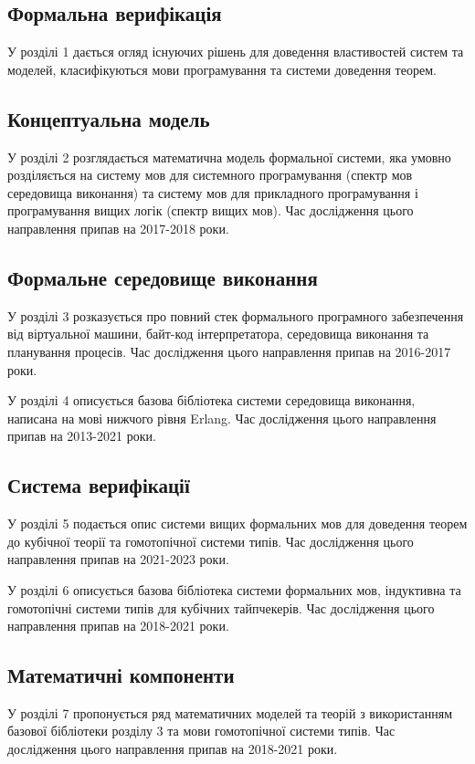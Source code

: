 \subsection*{Формальна верифікація}
У розділі 1 дається огляд існуючих рішень для доведення
властивостей систем та моделей, класифікуються мови програмування
та системи доведення теорем.

\subsection*{Концептуальна модель}
У розділі 2 розглядається математична модель формальної системи,
яка умовно розділяється на систему мов для системного
програмування (спектр мов середовища виконання) та систему мов для
прикладного програмування і програмування вищих логік (спектр вищих мов).
Час дослідження цього направлення припав на 2017-2018 роки.

\subsection*{Формальне середовище виконання}
У розділі 3 розказується про повний стек формального програмного забезпечення
від віртуальної машини, байт-код інтерпретатора, середовища виконання
та планування процесів. Час дослідження цього направлення припав на 2016-2017 роки.

У розділі 4 описується базова бібліотека системи середовища виконання,
написана на мові нижчого рівня Erlang.
Час дослідження цього направлення припав на 2013-2021 роки.

\newpage
\subsection*{Система верифікації}
У розділі 5 подається опис системи вищих формальних мов для доведення теорем до
кубічної теорії та гомотопічної системи типів.
Час дослідження цього направлення припав на 2021-2023 роки.

У розділі 6 описується базова бібліотека системи формальних мов, індуктивна
та гомотопічні системи типів для кубічних тайпчекерів.
Час дослідження цього направлення припав на 2018-2021 роки.

\subsection*{Математичні компоненти}
У розділі 7 пропонується ряд математичних моделей та теорій з використанням
базової бібліотеки розділу 3 та мови гомотопічної системи типів.
Час дослідження цього направлення припав на 2018-2021 роки.

